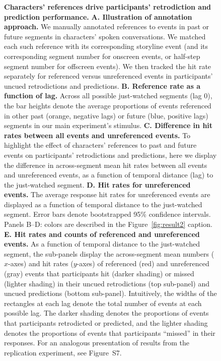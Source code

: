 \documentclass[10pt]{article}
\newcommand{\characterRefs}{S7}
\begin{document}
\begin{figure}[tp]
  \caption{\textbf{Characters' references drive participants' retrodiction and prediction performance.} \textbf{A. Illustration of annotation approach.} We manually annotated references to events in past or future segments in characters' spoken conversations. We matched each such reference with its corresponding storyline event (and its corresponding segment number for onscreen events, or half-step segment number for offscreen events). We then tracked the hit rate separately for referenced versus unreferenced events in participants' uncued retrodictions and predictions. \textbf{B. Reference rate as a function of lag.} Across all possible just-watched segments (lag 0), the bar heights denote the average proportions of events referenced in other past (orange, negative lags) or future (blue, positive lags) segments in our main experiment's stimulus. \textbf{C. Difference in hit rates between all events and unreferenced events.} To highlight the effect of characters' references to past and future events on participants' retrodictions and predictions, here we display the difference in across-segment mean hit rates between all events and unreferenced events, as a function of temporal distance (lag) to the just-watched segment. \textbf{D. Hit rates for unreferenced events.} The average response hit rates for unreferenced events are displayed as a function of temporal distance to the just-watched segment. Error bars denote bootstrapped 95\% confidence intervals. Panels B--D: colors are described in the Figure~\ref{fig:result2} caption. \textbf{E. Hit rates and counts of referenced and unreferenced events.} As a function of temporal distance to the just-watched segment, the sub-panels display the across-segment mean numbers ($x$-axes) and hit rates ($y$-axes) of referenced (red) and unreferenced (gray) events that participants hit (darker shading) or missed (lighter shading) in their uncued retrodictions (top sub-panel) and uncued predictions (bottom sub-panel). Intuitively, the widths of the rectangles at each lag denote the total number of events at each possible lag. The darker shading denotes the proportions of events that participants retrodicted or predicted, and the lighter shading denotes the proportions of events that participants ``missed'' in their responses. For an analogous presentation of results from the replication experiment, see Figure~\characterRefs.}

  \label{fig:result3}
\end{figure}
\end{document}
